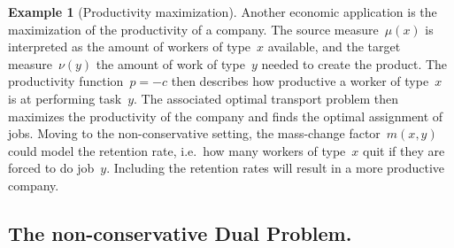 \documentclass{article}
\theoremstyle{definition}
\newtheorem{example}[theorem]{Example}
\begin{document}
\begin{example}[Productivity maximization]    
    Another economic application is the maximization of the productivity of a company. The source measure~$\mu(x)$ is interpreted as the amount of workers of type~$x$ available, and the target measure~$\nu(y)$ the amount of work of type~$y$ needed to create the product. The productivity function~$p = -c$ then describes how productive a worker of type~$x$ is at performing task~$y$. The associated optimal transport problem then maximizes the productivity of the company and finds the optimal assignment of jobs. Moving to the non-conservative setting, the mass-change factor~$m(x,y)$ could model the retention rate, i.e.~how many workers of type~$x$ quit if they are forced to do job~$y$. Including the retention rates will result in a more productive company. 
\end{example}




\subsection{The non-conservative Dual Problem.}\label{sec:ncot_dual_problem}
\end{document}
